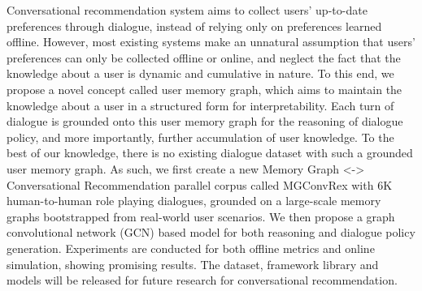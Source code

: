 Conversational recommendation system aims to collect users' up-to-date preferences through dialogue, instead of relying only on preferences learned offline.
However, most existing systems make an unnatural assumption that users' preferences can only be collected offline or online, and neglect the fact that the knowledge about a user is dynamic and cumulative in nature.
To this end, we propose a novel concept called user memory graph, which aims to maintain the knowledge about a user in a structured form for interpretability.
Each turn of dialogue is grounded onto this user memory graph for the reasoning of dialogue policy, and more importantly, further accumulation of user knowledge.
To the best of our knowledge, there is no existing dialogue dataset with such a grounded user memory graph.
As such, we first create a new Memory Graph <-> Conversational Recommendation parallel corpus called MGConvRex with 6K human-to-human role playing dialogues, grounded on a large-scale memory graphs bootstrapped from real-world user scenarios.
We then propose a graph convolutional network (GCN) based model for both reasoning and dialogue policy generation.
Experiments are conducted for both offline metrics and online simulation, showing promising results.
The dataset, framework library and models will be released for future research for conversational recommendation.
